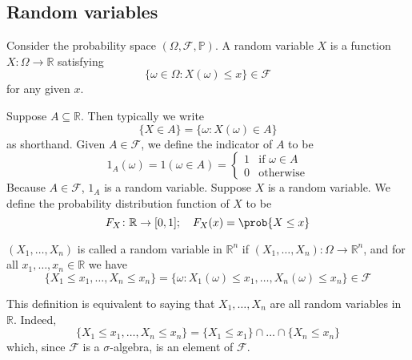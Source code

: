 \subsection{Random variables}
\begin{definition}
	Consider the probability space \((\Omega, \mathcal F, \mathbb P)\).
	A random variable \(X\) is a function \(X \colon \Omega \to \mathbb R\) satisfying
	\[
		\{ \omega \in \Omega \colon X(\omega) \leq x \} \in \mathcal F
	\]
	for any given \(x\).
\end{definition}
Suppose \(A \subseteq \mathbb R\).
Then typically we write
\[
	\{ X \in A \} = \{ \omega \colon X(\omega) \in A \}
\]
as shorthand.
Given \(A \in \mathcal F\), we define the indicator of \(A\) to be
\[
	1_A(\omega) = 1(\omega \in A) = \begin{cases}
		1 & \text{if } \omega \in A \\
		0 & \text{otherwise}
	\end{cases}
\]
Because \(A \in \mathcal F\), \(1_A\) is a random variable.
Suppose \(X\) is a random variable.
We define the probability distribution function of \(X\) to be
\[
	F_X \colon \mathbb R \to [0, 1];\quad F_X(x) = \prob{X \leq x}
\]
\begin{definition}
	\((X_1, \dots, X_n)\) is called a random variable in \(\mathbb R^n\) if \((X_1, \dots, X_n) \colon \Omega \to \mathbb R^n\), and for all \(x_1, \dots, x_n \in \mathbb R\) we have
	\[
		\{ X_1 \leq x_1, \dots, X_n \leq x_n \} = \{ \omega \colon X_1(\omega) \leq x_1, \dots, X_n(\omega) \leq x_n \} \in \mathcal F
	\]
\end{definition}
This definition is equivalent to saying that \(X_1, \dots, X_n\) are all random variables in \(\mathbb R\).
Indeed,
\[
	\{ X_1 \leq x_1, \dots, X_n \leq x_n \} = \{ X_1 \leq x_1 \} \cap \dots \cap \{ X_n \leq x_n \}
\]
which, since \(\mathcal F\) is a \(\sigma\)-algebra, is an element of \(\mathcal F\).

